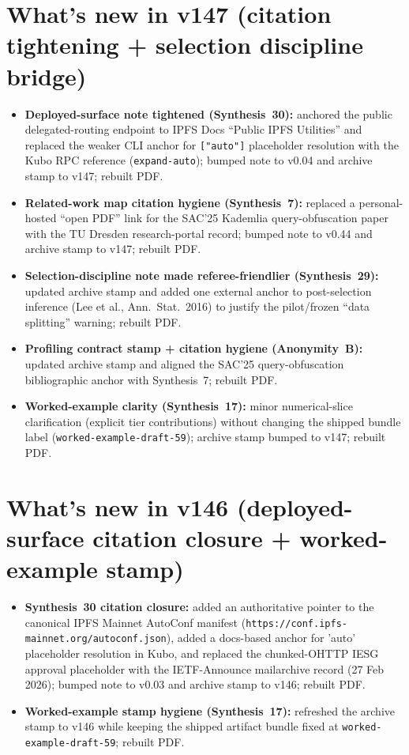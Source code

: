 \documentclass[11pt]{article}
\begin{document}
\section{What's new in v147 (citation tightening + selection discipline bridge)}
\begin{itemize}[leftmargin=*]
\item \textbf{Deployed-surface note tightened (Synthesis~30):} anchored the public delegated-routing endpoint to IPFS Docs ``Public IPFS Utilities'' and replaced the weaker CLI anchor for \texttt{["auto"]} placeholder resolution with the Kubo RPC reference (\texttt{expand-auto}); bumped note to v0.04 and archive stamp to v147; rebuilt PDF.
\item \textbf{Related-work map citation hygiene (Synthesis~7):} replaced a personal-hosted ``open PDF'' link for the SAC'25 Kademlia query-obfuscation paper with the TU Dresden research-portal record; bumped note to v0.44 and archive stamp to v147; rebuilt PDF.
\item \textbf{Selection-discipline note made referee-friendlier (Synthesis~29):} updated archive stamp and added one external anchor to post-selection inference (Lee et al., Ann.\ Stat.\ 2016) to justify the pilot/frozen ``data splitting'' warning; rebuilt PDF.
\item \textbf{Profiling contract stamp + citation hygiene (Anonymity~B):} updated archive stamp and aligned the SAC'25 query-obfuscation bibliographic anchor with Synthesis~7; rebuilt PDF.
\item \textbf{Worked-example clarity (Synthesis~17):} minor numerical-slice clarification (explicit tier contributions) without changing the shipped bundle label (\texttt{worked-example-draft-59}); archive stamp bumped to v147; rebuilt PDF.
\end{itemize}

\section{What's new in v146 (deployed-surface citation closure + worked-example stamp)}
\begin{itemize}[leftmargin=*]
\item \textbf{Synthesis~30 citation closure:} added an authoritative pointer to the canonical IPFS Mainnet AutoConf manifest (\texttt{https://conf.ipfs-mainnet.org/autoconf.json}), added a docs-based anchor for 'auto' placeholder resolution in Kubo, and replaced the chunked-OHTTP IESG approval placeholder with the IETF-Announce mailarchive record (27 Feb 2026); bumped note to v0.03 and archive stamp to v146; rebuilt PDF.
\item \textbf{Worked-example stamp hygiene (Synthesis~17):} refreshed the archive stamp to v146 while keeping the shipped artifact bundle fixed at \texttt{worked-example-draft-59}; rebuilt PDF.
\end{itemize}
\end{document}
